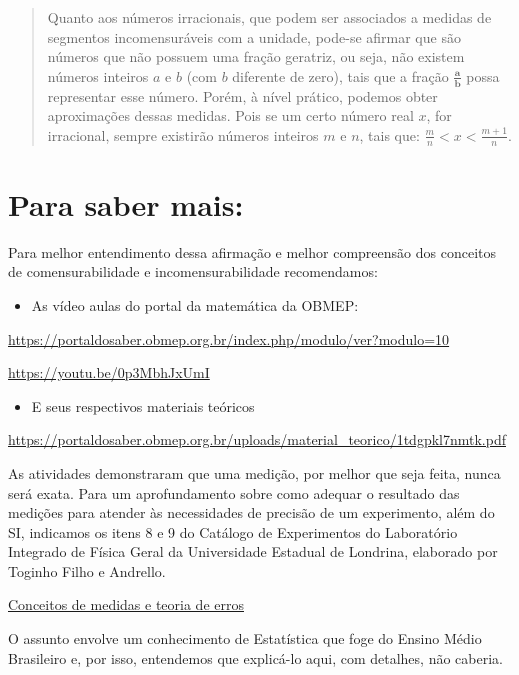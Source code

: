\begin{quote}
Quanto aos números irracionais, que podem ser associados a medidas de segmentos incomensuráveis com a unidade, pode-se afirmar que são números que não possuem uma fração geratriz, ou seja, não existem números inteiros \(a\) e \(b\) (com \(b\) diferente de zero), tais que a fração \(\frac{\mathbf{a}}{\mathbf{b}}\) possa representar esse número. Porém, à nível prático, podemos obter aproximações dessas medidas. Pois se um certo número real \(x\), for irracional, sempre existirão números inteiros \(m\) e \(n\), tais que: \(\frac{m}{n}<x<\frac{m+1}{n}\).
\end{quote}


\section{Para saber mais:}
\label{\detokenize{NO103-5:para-saber-mais}}
Para melhor entendimento dessa afirmação e melhor compreensão dos conceitos de comensurabilidade e incomensurabilidade recomendamos:
\begin{itemize}
\item {} 
As vídeo aulas do portal da matemática da OBMEP:

\end{itemize}

\url{https://portaldosaber.obmep.org.br/index.php/modulo/ver?modulo=10}

\url{https://youtu.be/0p3MbhJxUmI}
\begin{itemize}
\item {} 
E seus respectivos materiais teóricos

\end{itemize}

\url{https://portaldosaber.obmep.org.br/uploads/material\_teorico/1tdgpkl7nmtk.pdf}

As atividades demonstraram que uma medição, por melhor que seja feita, nunca será exata. Para um aprofundamento sobre como adequar o resultado das medições para atender às necessidades de precisão de um experimento, além do SI, indicamos os itens 8 e 9 do Catálogo de Experimentos do Laboratório Integrado de Física Geral da Universidade Estadual de Londrina, elaborado por Toginho Filho e Andrello.

\href{http://www.uel.br/pessoal/inocente/pages/arquivos/03-Conceitos\%20de\%20medidas\%20e\%20teoria\%20de\%20erros.pdf}{Conceitos de medidas e teoria de erros}

O assunto envolve um conhecimento de Estatística que foge do Ensino Médio Brasileiro e, por isso, entendemos que explicá-lo aqui, com detalhes, não caberia.


